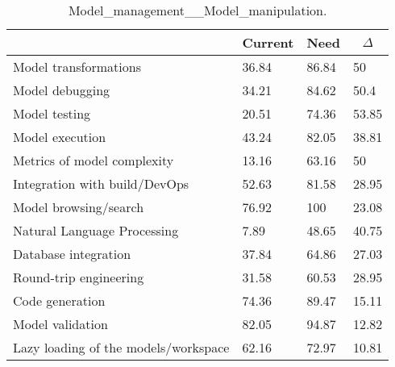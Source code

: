 
  \begin{table*}[]
  \centering
  \notsotiny
  \caption{ Model_management__Model_manipulation.}
\label{tab:model_management__model_manipulation}
\begin{tabular}{|l|l|l|l|}
  \hline
  \rowcolor[HTML]{C0C0C0}
    \multicolumn{1}{|c|}{Feature} & \multicolumn{1}{c|}{Current} & \multicolumn{1}{c|}{Need} & \multicolumn{1}{c|}{$\Delta$} \\ \hline
  Model transformations & 36.84 & 86.84 & 50 \\ \hline 
Model debugging & 34.21 & 84.62 & 50.4 \\ \hline 
Model testing & 20.51 & 74.36 & 53.85 \\ \hline 
Model execution & 43.24 & 82.05 & 38.81 \\ \hline 
Metrics of model complexity & 13.16 & 63.16 & 50 \\ \hline 
Integration with build/DevOps & 52.63 & 81.58 & 28.95 \\ \hline 
Model browsing/search & 76.92 & 100 & 23.08 \\ \hline 
Natural Language Processing & 7.89 & 48.65 & 40.75 \\ \hline 
Database integration & 37.84 & 64.86 & 27.03 \\ \hline 
Round-trip engineering & 31.58 & 60.53 & 28.95 \\ \hline 
Code generation & 74.36 & 89.47 & 15.11 \\ \hline 
Model validation & 82.05 & 94.87 & 12.82 \\ \hline 
Lazy loading of the models/workspace & 62.16 & 72.97 & 10.81 \\ \hline 
\end{tabular}%
  \end{table*}
